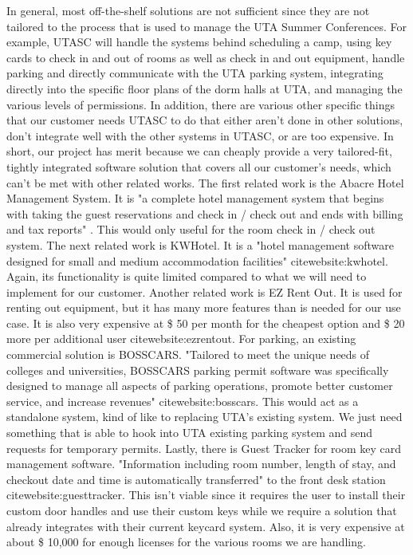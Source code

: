 In general, most off-the-shelf solutions are not sufficient since they are not tailored to the process that is used to manage the UTA Summer Conferences. For example, UTASC will handle the systems behind scheduling a camp, using key cards to check in and out of rooms as well as check in and out equipment, handle parking and directly communicate with the UTA parking system, integrating directly into the specific floor plans of the dorm halls at UTA, and managing the various levels of permissions. 
In addition, there are various other specific things that our customer needs UTASC to do that either aren't done in other solutions, don't integrate well with the other systems in UTASC, or are too expensive. In short, our project has merit because we can cheaply provide a very tailored-fit, tightly integrated software solution that covers all our customer's needs, which can't be met with other related works.
The first related work is the Abacre Hotel Management System. It is "a complete hotel management system that begins with taking the guest reservations and check in / check out and ends with billing and tax reports" \cite{website:abacre}. This would only useful for the room check in / check out system. 
The next related work is KWHotel. It is a "hotel management software designed for small and medium accommodation facilities" cite{website:kwhotel}. Again, its functionality is quite limited compared to what we will need to implement for our customer.
Another related work is EZ Rent Out. It is used for renting out equipment, but it has many more features than is needed for our use case. It is also very expensive at \$ 50 per month for the cheapest option and \$ 20 more per additional user cite{website:ezrentout}.
For parking, an existing commercial solution is BOSSCARS. "Tailored to meet the unique needs of colleges and universities, BOSSCARS parking permit software was specifically designed to manage all aspects of parking operations, promote better customer service, and increase revenues" cite{website:bosscars}. This would act as a standalone system, kind of like to replacing UTA's existing system. We just need something that is able to hook into UTA existing parking system and send requests for temporary permits.
Lastly, there is Guest Tracker for room key card management software. "Information including room number, length of stay, and checkout date and time is automatically transferred" to the front desk station cite{website:guesttracker}. This isn't viable since it requires the user to install their custom door handles and use their custom keys while we require a solution that already integrates with their current keycard system. Also, it is very expensive at about \$ 10,000 for enough licenses for the various rooms we are handling.
